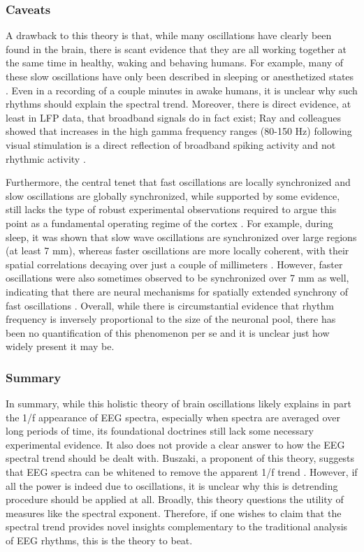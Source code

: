 \subsubsection{Caveats}
A drawback to this theory is that, while many oscillations have clearly been found in the brain, there is scant evidence that they are all working together at the same time in healthy, waking and behaving humans. For example, many of these slow oscillations have only been described in sleeping or anesthetized states \cite{Hromadka2013}. Even in a recording of a couple minutes in awake humans, it is unclear why such rhythms should explain the spectral trend. Moreover, there is direct evidence, at least in LFP data, that broadband signals do in fact exist; Ray and colleagues showed that increases in the high gamma frequency ranges (80-150 Hz) following visual stimulation is a direct reflection of broadband spiking activity and not rhythmic activity \cite{Ray2008,Ray2011}. 

Furthermore, the central tenet that fast oscillations are locally synchronized and slow oscillations are globally synchronized, while supported by some evidence, still lacks the type of robust experimental observations required to argue this point as a fundamental operating regime of the cortex \cite{Buzsaki2006}. For example, during sleep, it was shown that slow wave oscillations are synchronized over large regions (at least 7 mm), whereas faster oscillations are more locally coherent, with their spatial correlations decaying over just a couple of millimeters \cite{Destexhe1999}. However, faster oscillations were also sometimes observed to be synchronized over 7 mm as well, indicating that there are neural mechanisms for spatially extended synchrony of fast oscillations \cite{Destexhe1999}. Overall, while there is circumstantial evidence that rhythm frequency is inversely proportional to the size of the neuronal pool, there has been no quantification of this phenomenon per se and it is unclear just how widely present it may be.

\subsubsection{Summary}
In summary, while this holistic theory of brain oscillations likely explains in part the 1/f appearance of EEG spectra, especially when spectra are averaged over long periods of time, its foundational doctrines still lack some necessary experimental evidence. It also does not provide a clear answer to how the EEG spectral trend should be dealt with. Buszaki, a proponent of this theory, suggests that EEG spectra can be whitened to remove the apparent 1/f trend \cite{Buzsaki2006}. However, if all the power is indeed due to oscillations, it is unclear why this is detrending procedure should be applied at all. Broadly, this theory questions the utility of measures like the spectral exponent. Therefore, if one wishes to claim that the spectral trend provides novel insights complementary to the traditional analysis of EEG rhythms, this is the theory to beat.

